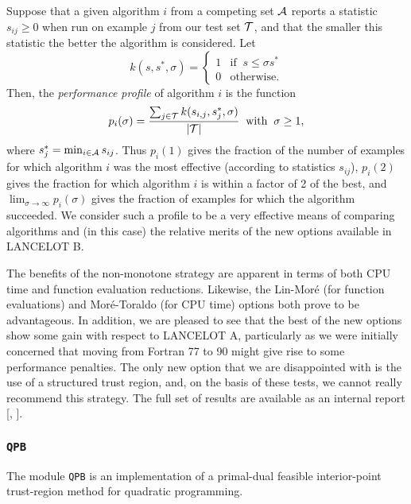 \documentclass[acmtocl,acmnow]{acmtrans2m}
\newcommand{\lana}{{\sf LANCELOT A}}
\newcommand{\lanb}{{\sf LANCELOT B}}
\newcommand{\ltsubsubsection}[1]{\subsubsection{{\tt #1}} \label{#1}}
\newcommand{\bciteb}[1]{\citeauthor{#1}, \citeyear{#1}}
\newcommand{\calA}{{\cal A}} \newcommand{\calB}{{\cal B}}
\newcommand{\disp}[1]{\[{#1}\]}
\begin{document}
Suppose that a given algorithm $i$ from a competing set $\calA$
reports a statistic $s_{ij} \geq 0$ 
when run on example $j$ from our test set $\calT$,
and that the smaller this statistic the better the algorithm is considered.
Let 
\disp{k(s,s^*,\sigma) = 
 \left\{ 
\begin{array}{rl}
 1 & \mbox{if} \;\; s \leq \sigma s^* \\ 0 & \mbox{otherwise.}
\end{array} 
\right.
}
Then, the {\em performance profile} of algorithm $i$ is the function 
\disp{p_i(\sigma) = \frac{ 
\sum_{j \in \calT} k(s_{i,j},s^*_{j},\sigma)}{|\calT|} \;\;\mbox{with}\;\; 
\sigma \geq 1,}
where $s^*_j = \min_{i \in \calA} s_{ij}$.
Thus $p_i(1)$ gives the fraction of the number of examples for which 
algorithm $i$ was the most effective (according to statistics $s_{ij}$),
$p_i(2)$ gives 
the fraction for which algorithm $i$ 
is within a factor of 2 of the best, and $\lim_{\sigma\longrightarrow\infty}
p_i(\sigma)$ gives the fraction of examples for which the algorithm
succeeded. We consider such a profile to be a very effective means
of comparing algorithms and (in this case)
the relative merits of the new options available in \lanb.

The benefits of the non-monotone strategy
are apparent in terms of both CPU time and function evaluation reductions.
Likewise, the Lin-Mor\'{e} (for function evaluations) 
and Mor\'{e}-Toraldo (for CPU time) options both prove to be advantageous.
In addition, we are pleased to see that 
the best of the new options show some gain with respect to 
\lana, particularly as we were initially concerned that moving from 
Fortran 77 to 90 might give rise to some performance penalties.
The only new option that we are disappointed with is the use of a
structured trust region, and, on the basis of these tests, 
we cannot really recommend this strategy. The full set of results
are available as an internal report [\bciteb{goulorbatoin02c}].

\ltsubsubsection{QPB}

The module {\tt QPB} is an implementation of a primal-dual 
feasible interior-point trust-region method for quadratic programming.
\end{document}

